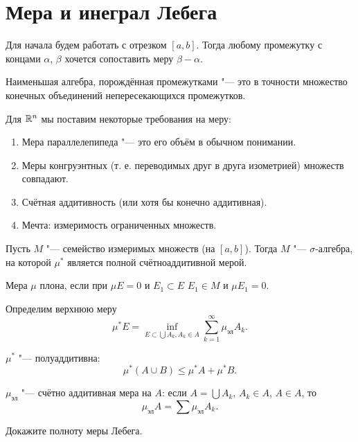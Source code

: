\documentclass[main]{subfiles}
\begin{document}
\section{Мера и инеграл Лебега}%
Для начала будем работать с отрезком $[a, b]$.
Тогда любому промежутку с концами $\alpha$, $\beta$
хочется сопоставить меру $\beta - \alpha$.

\begin{proposition}
  Наименьшая алгебра, порождённая промежутками "---
  это в точности множество конечных объединений непересекающихся
  промежутков.
\end{proposition}

Для $\mathbb{R}^n$ мы поставим некоторые требования на меру:
\begin{enumerate}
  \item Мера параллелепипеда "--- это его объём в обычном понимании.
  \item Меры конгруэнтных (т. е. переводимых друг в друга изометрией) множеств
    совпадают.
  \item Счётная аддитивность (или хотя бы конечно аддитивная).
  \item Мечта: измеримость ограниченных множеств.
\end{enumerate}

\begin{theorem}[Лебег]
  Пусть $M$ "--- семейство измеримых множеств (на $[a, b]$).
  Тогда $M$ "--- $\sigma$-алгебра, на которой $\mu^*$ является
  полной счётноаддитивной мерой.
\end{theorem}

\begin{definition}
  Мера $\mu$ плона, если при $\mu E = 0$ и $E_1 \subset E$
  $E_1 \in M$ и $\mu E_1 = 0$.
\end{definition}

Определим верхнюю меру
\[ \mu^* E = \inf_{E \subset \bigcup A_k, A_k \in A} \sum_{k = 1}^\infty \mu_{\text{эл}} A_k. \]

\begin{exercise}
  $\mu^*$ "--- полуаддитивна:
  \[ \mu^*(A \cup B) \le \mu^* A + \mu^* B. \]
\end{exercise}

\begin{exercise}
  $\mu_{\text{эл}}$ "--- счётно аддитивная мера на $A$:
  если $A = \bigcup A_k$, $A_k \in A$, $A \in A$, то
  \[ \mu_{\text{эл}} A = \sum \mu_{\text{эл}} A_k. \]
\end{exercise}

\begin{exercise}
  Докажите полноту меры Лебега.
\end{exercise}
\end{document}

